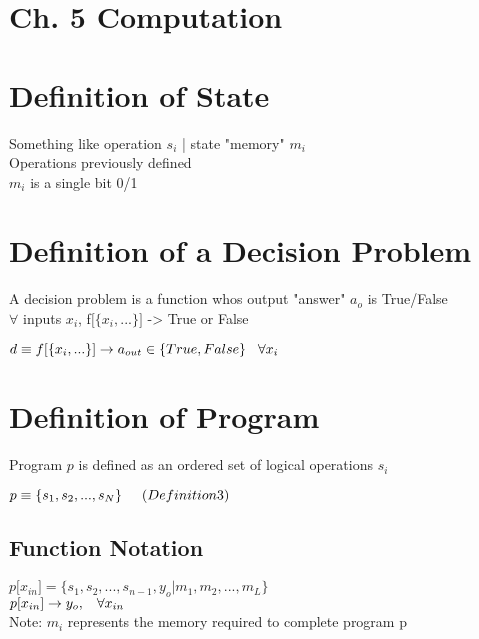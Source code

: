 \documentclass[11pt]{article}
\begin{document}
\section*{Ch. 5 Computation}


\section{Definition of State}
Something like operation $s_i$ | state "memory" $m_i$\\
Operations previously defined\\
$m_i$ is a single bit 0/1


\section{Definition of a Decision Problem}
A decision problem is a function whos output "answer" $a_o$ is True/False
\\ $\forall$  inputs $x_i$, f$\lbrack$$\{x_i,...\}\rbrack$ -> True or False 
\begin{center}
$
d \equiv f \lbrack \{x_i,...\} \rbrack \rightarrow a_{out} \in \{True, False\} \hspace{3mm} \forall x_i
$
\end{center}






\section{Definition of Program}
Program $p$ is defined as an ordered set of logical operations $s_i$
\begin{center}
$
p \equiv \{ s_1,s_2,...,s_N \} \hspace{5mm} (Definition 3)
$
\end{center}


\subsection{Function Notation}
\begin{center}
$
p\lbrack x_{in}\rbrack = \{ s_1, s_2,...,s_{n-1}, y_o | m_1, m_2,...,m_L\}
$
\\
$
p\lbrack x_{in}\rbrack \rightarrow y_o, \hspace{3mm} \forall x_{in}
$
\\
\vspace{2mm}
Note: $m_i$ represents the memory required to complete program p
\end{center}
\end{document}
